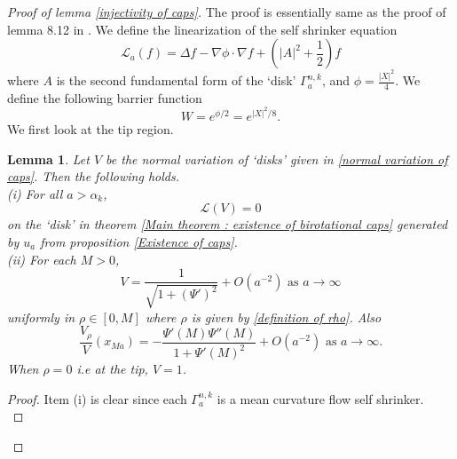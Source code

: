 \documentclass[pdflatex,sn-mathphys-num]{sn-jnl}
\newtheorem{lemma}[theorem]{Lemma}
\begin{document}
\begin{proof}[Proof of lemma \ref{injectivity of caps}]
    The proof is essentially same as the proof of lemma 8.12 in \cite{ADS}. We define the linearization of the self shrinker equation
    \begin{equation}\label{linearized operator}
        \mathcal{L}_a(f)  = \Delta f - \nabla \phi \cdot \nabla f + (|A|^2 + \frac{1}{2})f
    \end{equation}
    where $A$ is the second fundamental form of the `disk' $\Gamma^{n,k}_a$, and $\phi = \frac{|X|^2}{4}$. We define the following barrier function
    \begin{equation}\label{Barrier function W}
        W = e^{\phi/2} = e^{|X|^2/8}.
    \end{equation}
    We first look at the tip region. 
\begin{lemma}\label{Asymptotic expansion of V in cap}Let $V$ be the normal variation of `disks' given in \eqref{normal variation of caps}. Then the following holds. \\

(i) For all $a > \alpha_k$, 
    $$\mathcal{L}(V) = 0$$
     on the `disk' in theorem \ref{Main theorem : existence of birotational caps} generated by $u_a$ from proposition \ref{Existence of caps}.\\
     
    (ii) For each $M > 0$,
    $$V = \frac{1}{\sqrt{1 + (\Psi')^2}} + O(a^{-2}) \text{ as }a \to \infty$$
    uniformly in $\rho \in [0, M]$ where $\rho$ is given by \eqref{definition of rho}. Also
    $$\frac{V_{\rho}}{V}(x_{Ma}) = - \frac{\Psi'(M)\Psi''(M)}{1 + \Psi'(M)^2} + O(a^{-2}) \text{ as }a \to \infty.$$
    When $\rho = 0$ i.e at the tip, $V = 1$. 
\end{lemma}
\begin{proof}
    Item (i) is clear since each $\Gamma^{n,k}_a$ is a mean curvature flow self shrinker. \\


\end{proof}
\end{proof}
\end{document}
